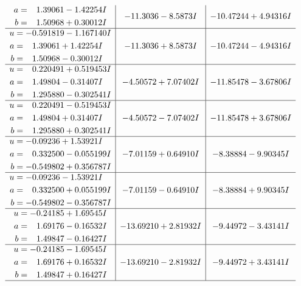 \documentclass[1p]{elsarticle_modified}
\theoremstyle{definition}
\begin{document}
$$\begin{array}{c|c|c}
\begin{aligned}
a &= \phantom{-}1.39061 - 1.42254 I \\
b &= \phantom{-}1.50968 + 0.30012 I\end{aligned}
 & -11.3036 - 8.5873 I & -10.47244 + 4.94316 I \\ \hline\begin{aligned}
u &= -0.591819 - 1.167140 I \\
a &= \phantom{-}1.39061 + 1.42254 I \\
b &= \phantom{-}1.50968 - 0.30012 I\end{aligned}
 & -11.3036 + 8.5873 I & -10.47244 - 4.94316 I \\ \hline\begin{aligned}
u &= \phantom{-}0.220491 + 0.519453 I \\
a &= \phantom{-}1.49804 - 0.31407 I \\
b &= \phantom{-}1.295880 - 0.302541 I\end{aligned}
 & -4.50572 + 7.07402 I & -11.85478 - 3.67806 I \\ \hline\begin{aligned}
u &= \phantom{-}0.220491 - 0.519453 I \\
a &= \phantom{-}1.49804 + 0.31407 I \\
b &= \phantom{-}1.295880 + 0.302541 I\end{aligned}
 & -4.50572 - 7.07402 I & -11.85478 + 3.67806 I \\ \hline\begin{aligned}
u &= -0.09236 + 1.53921 I \\
a &= \phantom{-}0.332500 - 0.055199 I \\
b &= -0.549802 + 0.356787 I\end{aligned}
 & -7.01159 + 0.64910 I & -8.38884 - 9.90345 I \\ \hline\begin{aligned}
u &= -0.09236 - 1.53921 I \\
a &= \phantom{-}0.332500 + 0.055199 I \\
b &= -0.549802 - 0.356787 I\end{aligned}
 & -7.01159 - 0.64910 I & -8.38884 + 9.90345 I \\ \hline\begin{aligned}
u &= -0.24185 + 1.69545 I \\
a &= \phantom{-}1.69176 - 0.16532 I \\
b &= \phantom{-}1.49847 - 0.16427 I\end{aligned}
 & -13.69210 + 2.81932 I & -9.44972 - 3.43141 I \\ \hline\begin{aligned}
u &= -0.24185 - 1.69545 I \\
a &= \phantom{-}1.69176 + 0.16532 I \\
b &= \phantom{-}1.49847 + 0.16427 I\end{aligned}
 & -13.69210 - 2.81932 I & -9.44972 + 3.43141 I\\
 \hline 
 \end{array}$$\newpage\newpage\renewcommand{\arraystretch}{1}
\end{document}
